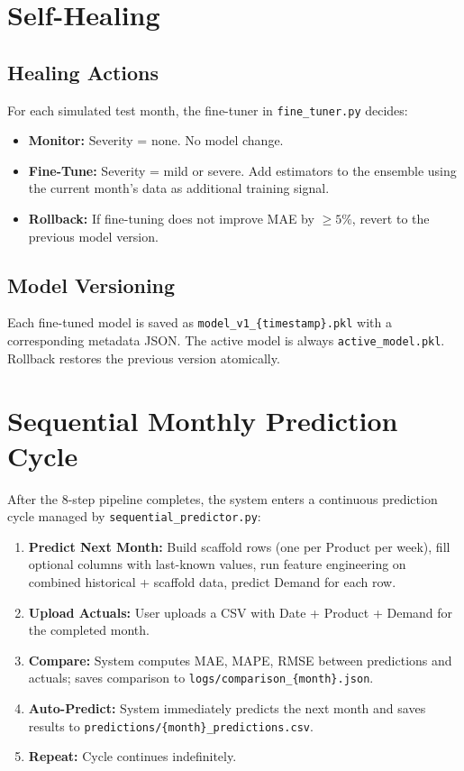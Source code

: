 \documentclass[conference]{IEEEtran}
\begin{document}
\section{Self-Healing}

\subsection{Healing Actions}

For each simulated test month, the fine-tuner in \texttt{fine\_tuner.py} decides:

\begin{itemize}
    \item \textbf{Monitor:} Severity = none. No model change.
    \item \textbf{Fine-Tune:} Severity = mild or severe. Add estimators to the ensemble using the current month's data as additional training signal.
    \item \textbf{Rollback:} If fine-tuning does not improve MAE by $\geq 5\%$, revert to the previous model version.
\end{itemize}

\subsection{Model Versioning}

Each fine-tuned model is saved as \texttt{model\_v1\_\{timestamp\}.pkl} with a corresponding metadata JSON. The active model is always \texttt{active\_model.pkl}. Rollback restores the previous version atomically.

\section{Sequential Monthly Prediction Cycle}

After the 8-step pipeline completes, the system enters a continuous prediction cycle managed by \texttt{sequential\_predictor.py}:

\begin{enumerate}
    \item \textbf{Predict Next Month:} Build scaffold rows (one per Product per week), fill optional columns with last-known values, run feature engineering on combined historical + scaffold data, predict Demand for each row.
    \item \textbf{Upload Actuals:} User uploads a CSV with Date + Product + Demand for the completed month.
    \item \textbf{Compare:} System computes MAE, MAPE, RMSE between predictions and actuals; saves comparison to \texttt{logs/comparison\_\{month\}.json}.
    \item \textbf{Auto-Predict:} System immediately predicts the next month and saves results to \texttt{predictions/\{month\}\_predictions.csv}.
    \item \textbf{Repeat:} Cycle continues indefinitely.
\end{enumerate}
\end{document}
